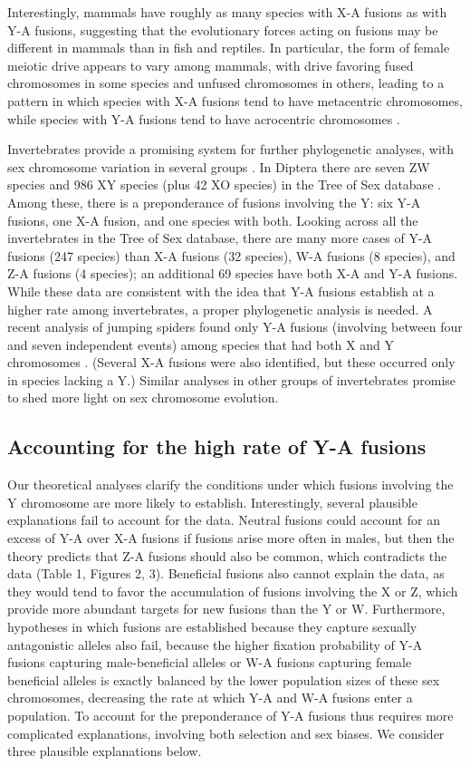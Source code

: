Interestingly, mammals have roughly as many species with X-A fusions as with Y-A fusions, suggesting that the evolutionary forces acting on fusions may be different in mammals than in fish and reptiles. In particular, the form of female meiotic drive appears to vary among mammals, with drive favoring fused chromosomes in some species and unfused chromosomes in others, leading to a pattern in which species with X-A fusions tend to have metacentric chromosomes, while species with Y-A fusions tend to have acrocentric chromosomes \citep{Yoshida2012}.

Invertebrates provide a promising system for further phylogenetic analyses, with sex chromosome variation in several groups \citep{Bull1983, ToS}. In Diptera there are seven ZW species and 986 XY species (plus 42 XO species) in the Tree of Sex database \citep{ToS}. Among these, there is a preponderance of fusions involving the Y: six Y-A fusions, one X-A fusion, and one species with both. Looking across all the invertebrates in the Tree of Sex database, there are many more cases of Y-A fusions (247 species) than X-A fusions (32 species), W-A fusions (8 species), and Z-A fusions (4 species); an additional 69 species have both X-A and Y-A fusions. While these data are consistent with the idea that Y-A fusions establish at a higher rate among invertebrates, a proper phylogenetic analysis is needed. A recent analysis of jumping spiders found only Y-A fusions (involving between four and seven independent events) among species that had both X and Y chromosomes \citep{White1973, Maddison2013}. (Several X-A fusions were also identified, but these occurred only in species lacking a Y.) Similar analyses in other groups of invertebrates promise to shed more light on sex chromosome evolution.

\subsection{Accounting for the high rate of Y-A fusions}

Our theoretical analyses clarify the conditions under which fusions involving the Y chromosome are more likely to establish. Interestingly, several plausible explanations fail to account for the data. Neutral fusions could account for an excess of Y-A over X-A fusions if fusions arise more often in males, but then the theory predicts that Z-A fusions should also be common, which contradicts the data (Table 1, Figures 2, 3). Beneficial fusions also cannot explain the data, as they would tend to favor the accumulation of fusions involving the X or Z, which provide more abundant targets for new fusions than the Y or W. Furthermore, hypotheses in which fusions are established because they capture sexually antagonistic alleles also fail, because the higher fixation probability of Y-A fusions capturing male-beneficial alleles or W-A fusions capturing female beneficial alleles is exactly balanced by the lower population sizes of these sex chromosomes, decreasing the rate at which Y-A and W-A fusions enter a population. To account for the preponderance of Y-A fusions thus requires more complicated explanations, involving both selection and sex biases. We consider three plausible explanations below.

